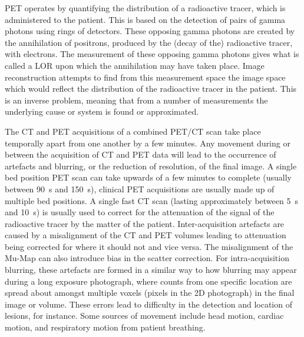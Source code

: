         \gls{PET} operates by quantifying the distribution of a radioactive tracer, which is administered to the patient. This is based on the detection of pairs of gamma photons using rings of detectors. These opposing gamma photons are created by the annihilation of positrons, produced by the (decay of the) radioactive tracer, with electrons. The measurement of these opposing gamma photons gives what is called a \gls{LOR} upon which the annihilation may have taken place. Image reconstruction attempts to find from this measurement space the image space which would reflect the distribution of the radioactive tracer in the patient. This is an inverse problem, meaning that from a number of measurements the underlying cause or system is found or approximated.
            
        The \gls{CT} and \gls{PET} acquisitions of a combined \gls{PET}/\gls{CT} scan take place temporally apart from one another by a few minutes. Any movement during or between the acquisition of \gls{CT} and \gls{PET} data will lead to the occurrence of artefacts and blurring, or the reduction of resolution, of the final image. A single bed position \gls{PET} scan can take upwards of a few minutes to complete (usually between \SI{90}{\second} and \SI{150}{\second}), clinical \gls{PET} acquisitions are usually made up of multiple bed positions. A single fast \gls{CT} scan (lasting approximately between \SI{5}{\second} and \SI{10}{\second}) is usually used to correct for the attenuation of the signal of the radioactive tracer by the matter of the patient. Inter-acquisition artefacts are caused by a misalignment of the \gls{CT} and \gls{PET} volumes leading to attenuation being corrected for where it should not and vice versa. The misalignment of the \gls{Mu-Map} can also introduce bias in the scatter correction. For intra-acquisition blurring, these artefacts are formed in a similar way to how blurring may appear during a long exposure photograph, where counts from one specific location are spread about amongst multiple voxels (pixels in the \gls{2D} photograph) in the final image or volume. These errors lead to difficulty in the detection and location of lesions, for instance. Some sources of movement include head motion, cardiac motion, and respiratory motion from patient breathing.
    
